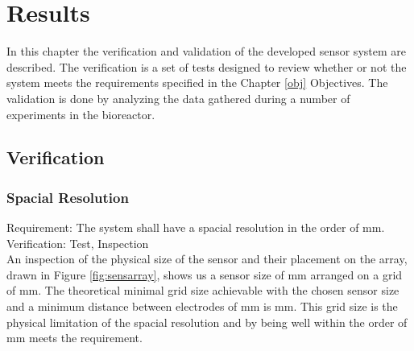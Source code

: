 \chapter{Results}

In this chapter the verification and validation of the developed sensor system are described. The verification is a set of tests designed to review whether or not the system meets the requirements specified in the Chapter \ref{obj} Objectives. The validation is done by analyzing the data gathered during a number of experiments in the bioreactor.

\section{Verification}

\subsection{Spacial Resolution}

Requirement: The system shall have a spacial resolution in the order of \unit[10]{mm}.\\
Verification: Test, Inspection\\

An inspection of the physical size of the sensor and their placement on the array, drawn in Figure \ref{fig:sensarray}, shows us a sensor size of \unit[10x11]{mm} arranged on a grid of \unit[25x50]{mm}. The theoretical minimal grid size achievable with the chosen sensor size and a minimum distance between electrodes of \unit[1]{mm} is \unit[11x12]{mm}.
This grid size is the physical limitation of the spacial resolution and by being well within the order of \unit[10]{mm} meets the requirement.\\


